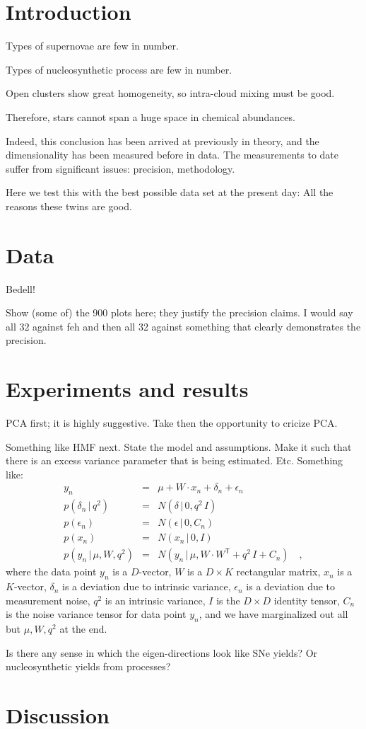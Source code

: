 \documentclass[12pt]{article}
\newcommand{\given}{\,|\,}
\newcommand{\trans}[1]{{#1}^{\!\mathsf{T}}}
\begin{document}
\section{Introduction}

Types of supernovae are few in number.

Types of nucleosynthetic process are few in number.

Open clusters show great homogeneity, so intra-cloud mixing must be good.

Therefore, stars cannot span a huge space in chemical abundances.

Indeed, this conclusion has been arrived at previously in theory, and
the dimensionality has been measured before in data. The measurements to
date suffer from significant issues: precision, methodology.

Here we test this with the best possible data set at the present day:
All the reasons these twins are good.

\section{Data}

Bedell!

Show (some of) the 900 plots here; they justify the precision claims.
I would say all 32 against feh and then all 32 against something that
clearly demonstrates the precision.

\section{Experiments and results}

PCA first; it is highly suggestive. Take then the opportunity to cricize PCA.

Something like HMF next. State the model and assumptions. Make it such that
there is an excess variance parameter that is being estimated. Etc.
Something like:
\begin{eqnarray}
y_n &=& \mu + W\cdot x_n + \delta_n + \epsilon_n
\\
p(\delta_n\given q^2) &=& N(\delta\given 0, q^2\,I)
\\
p(\epsilon_n) &=& N(\epsilon\given 0, C_n)
\\
p(x_n) &=& N(x_n\given 0, I)
\\
p(y_n\given \mu,W,q^2) &=& N(y_n\given \mu, W\cdot\trans{W}+q^2\,I+C_n)
\quad ,
\end{eqnarray}
where the data point $y_n$ is a $D$-vector,
$W$ is a $D\times K$ rectangular matrix,
$x_n$ is a $K$-vector,
$\delta_n$ is a deviation due to intrinsic variance,
$\epsilon_n$ is a deviation due to measurement noise,
$q^2$ is an intrinsic variance,
$I$ is the $D\times D$ identity tensor,
$C_n$ is the noise variance tensor for data point $y_n$,
and we have marginalized out all but $\mu,W,q^2$ at the end.

Is there any sense in which the eigen-directions look like SNe yields?
Or nucleosynthetic yields from processes?

\section{Discussion}
\end{document}
